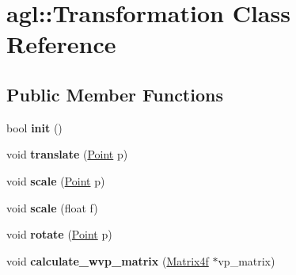 \hypertarget{classagl_1_1Transformation}{}\section{agl\+::Transformation Class Reference}
\label{classagl_1_1Transformation}
\subsection*{Public Member Functions}
\begin{DoxyCompactItemize}
\item 
\mbox{\label{classagl_1_1Transformation_ae8d0487e6f9e427027fc3e86179b9666}} 
bool {\bfseries init} ()
\item 
\mbox{\label{classagl_1_1Transformation_a9de3b1c49c3c981b2231c5024cc1362b}} 
void {\bfseries translate} (\mbox{\hyperlink{classagl_1_1Point}{Point}} p)
\item 
\mbox{\label{classagl_1_1Transformation_a3ed9bfab1f3ddbb660d961a2197bae73}} 
void {\bfseries scale} (\mbox{\hyperlink{classagl_1_1Point}{Point}} p)
\item 
\mbox{\label{classagl_1_1Transformation_a634ba87b8f767acafcd09e0c15dd357d}} 
void {\bfseries scale} (float f)
\item 
\mbox{\label{classagl_1_1Transformation_ad313b2977a91aae7879c816f8cd00dc7}} 
void {\bfseries rotate} (\mbox{\hyperlink{classagl_1_1Point}{Point}} p)
\item 
\mbox{\label{classagl_1_1Transformation_adf068efbc01592a6fbe5e28660953dec}} 
void {\bfseries calculate\+\_\+wvp\+\_\+matrix} (\mbox{\hyperlink{classagl_1_1Matrix4f}{Matrix4f}} $\ast$vp\+\_\+matrix)
\end{DoxyCompactItemize}
